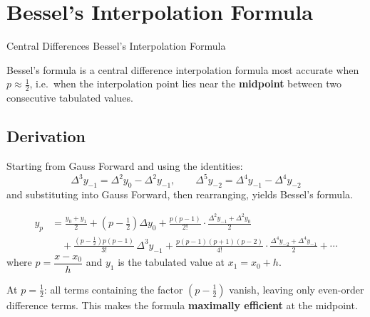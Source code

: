 \documentclass[12pt]{article}
\begin{document}
\newpage
\section{Bessel's Interpolation Formula}

\begin{methodtitle}{Central Differences}{}
  Bessel's Interpolation Formula
\end{methodtitle}

\begin{defbox}
Bessel's formula is a central difference interpolation formula most accurate when $p \approx \tfrac{1}{2}$, i.e.\ when the interpolation point lies near the \textbf{midpoint} between two consecutive tabulated values.
\end{defbox}

\subsection*{Derivation}

\begin{derivbox}
Starting from Gauss Forward and using the identities:
\[
  \Delta^3 y_{-1} = \Delta^2 y_0 - \Delta^2 y_{-1}, \qquad
  \Delta^5 y_{-2} = \Delta^4 y_{-1} - \Delta^4 y_{-2}
\]
and substituting into Gauss Forward, then rearranging, yields Bessel's formula.
\end{derivbox}

\begin{thmbox}
\begin{align*}
  y_p &= \frac{y_0+y_1}{2}
  + \!\left(p-\frac{1}{2}\right)\Delta y_0
  + \frac{p(p-1)}{2!}\cdot\frac{\Delta^2 y_{-1}+\Delta^2 y_0}{2} \\[6pt]
  &\quad + \frac{\!\left(p-\frac{1}{2}\right)p(p-1)}{3!}\,\Delta^3 y_{-1}
  + \frac{p(p-1)(p+1)(p-2)}{4!}\cdot\frac{\Delta^4 y_{-2}+\Delta^4 y_{-1}}{2}
  + \cdots
\end{align*}
where $p = \dfrac{x - x_0}{h}$ and $y_1$ is the tabulated value at $x_1 = x_0 + h$.
\end{thmbox}

\begin{keybox}
At $p = \tfrac{1}{2}$: all terms containing the factor $\left(p - \tfrac{1}{2}\right)$ vanish, leaving only even-order difference terms. This makes the formula \textbf{maximally efficient} at the midpoint.
\end{keybox}
\end{document}
